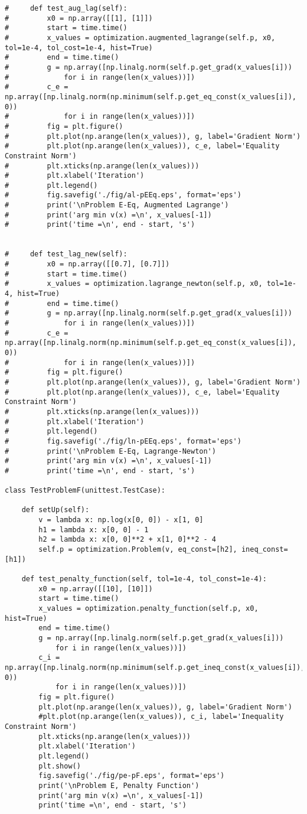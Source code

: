 \begin{lstlisting}
#     def test_aug_lag(self):
#         x0 = np.array([[1], [1]])
#         start = time.time()
#         x_values = optimization.augmented_lagrange(self.p, x0, tol=1e-4, tol_cost=1e-4, hist=True)
#         end = time.time()
#         g = np.array([np.linalg.norm(self.p.get_grad(x_values[i]))
#             for i in range(len(x_values))])
#         c_e = np.array([np.linalg.norm(np.minimum(self.p.get_eq_const(x_values[i]), 0))
#             for i in range(len(x_values))])
#         fig = plt.figure()
#         plt.plot(np.arange(len(x_values)), g, label='Gradient Norm')
#         plt.plot(np.arange(len(x_values)), c_e, label='Equality Constraint Norm')
#         plt.xticks(np.arange(len(x_values)))
#         plt.xlabel('Iteration')
#         plt.legend()
#         fig.savefig('./fig/al-pEEq.eps', format='eps')
#         print('\nProblem E-Eq, Augmented Lagrange')
#         print('arg min v(x) =\n', x_values[-1])
#         print('time =\n', end - start, 's')


#     def test_lag_new(self):
#         x0 = np.array([[0.7], [0.7]])
#         start = time.time()
#         x_values = optimization.lagrange_newton(self.p, x0, tol=1e-4, hist=True)
#         end = time.time()
#         g = np.array([np.linalg.norm(self.p.get_grad(x_values[i]))
#             for i in range(len(x_values))])
#         c_e = np.array([np.linalg.norm(np.minimum(self.p.get_eq_const(x_values[i]), 0))
#             for i in range(len(x_values))])
#         fig = plt.figure()
#         plt.plot(np.arange(len(x_values)), g, label='Gradient Norm')
#         plt.plot(np.arange(len(x_values)), c_e, label='Equality Constraint Norm')
#         plt.xticks(np.arange(len(x_values)))
#         plt.xlabel('Iteration')
#         plt.legend()
#         fig.savefig('./fig/ln-pEEq.eps', format='eps')
#         print('\nProblem E-Eq, Lagrange-Newton')
#         print('arg min v(x) =\n', x_values[-1])
#         print('time =\n', end - start, 's')

class TestProblemF(unittest.TestCase):

    def setUp(self):
        v = lambda x: np.log(x[0, 0]) - x[1, 0]
        h1 = lambda x: x[0, 0] - 1
        h2 = lambda x: x[0, 0]**2 + x[1, 0]**2 - 4
        self.p = optimization.Problem(v, eq_const=[h2], ineq_const=[h1])

    def test_penalty_function(self, tol=1e-4, tol_const=1e-4):
        x0 = np.array([[10], [10]])
        start = time.time()
        x_values = optimization.penalty_function(self.p, x0, hist=True)
        end = time.time()
        g = np.array([np.linalg.norm(self.p.get_grad(x_values[i]))
            for i in range(len(x_values))])
        c_i = np.array([np.linalg.norm(np.minimum(self.p.get_ineq_const(x_values[i]), 0))
            for i in range(len(x_values))])
        fig = plt.figure()
        plt.plot(np.arange(len(x_values)), g, label='Gradient Norm')
        #plt.plot(np.arange(len(x_values)), c_i, label='Inequality Constraint Norm')
        plt.xticks(np.arange(len(x_values)))
        plt.xlabel('Iteration')
        plt.legend()
        plt.show()
        fig.savefig('./fig/pe-pF.eps', format='eps')
        print('\nProblem E, Penalty Function')
        print('arg min v(x) =\n', x_values[-1])
        print('time =\n', end - start, 's')
    

\end{lstlisting}
